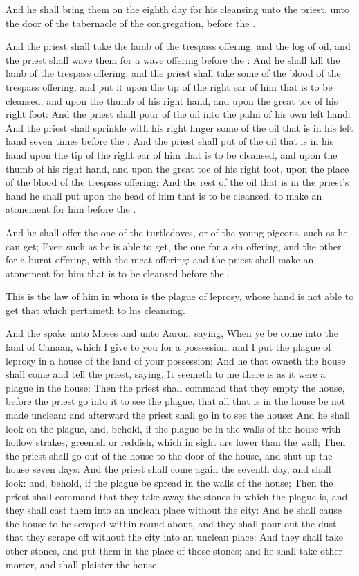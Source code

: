 \verse And he shall bring them on the eighth day for his cleansing unto the priest, unto the door of the tabernacle of the congregation, before the \LORD.

\verse And the priest shall take the lamb of the trespass offering, and the log of oil, and the priest shall wave them for a wave offering before the \LORD: \verse And he shall kill the lamb of the trespass offering, and the priest shall take some of the blood of the trespass offering, and put it upon the tip of the right ear of him that is to be cleansed, and upon the thumb of his right hand, and upon the great toe of his right foot: \verse And the priest shall pour of the oil into the palm of his own left hand: \verse And the priest shall sprinkle with his right finger some of the oil that is in his left hand seven times before the \LORD: \verse And the priest shall put of the oil that is in his hand upon the tip of the right ear of him that is to be cleansed, and upon the thumb of his right hand, and upon the great toe of his right foot, upon the place of the blood of the trespass offering: \verse And the rest of the oil that is in the priest's hand he shall put upon the head of him that is to be cleansed, to make an atonement for him before the \LORD.

\verse And he shall offer the one of the turtledoves, or of the young pigeons, such as he can get; \verse Even such as he is able to get, the one for a sin offering, and the other for a burnt offering, with the meat offering: and the priest shall make an atonement for him that is to be cleansed before the \LORD.

\verse This is the law of him in whom is the plague of leprosy, whose hand is not able to get that which pertaineth to his cleansing.

\verse And the \LORD spake unto Moses and unto Aaron, saying, \verse When ye be come into the land of Canaan, which I give to you for a possession, and I put the plague of leprosy in a house of the land of your possession; \verse And he that owneth the house shall come and tell the priest, saying, It seemeth to me there is as it were a plague in the house: \verse Then the priest shall command that they empty the house, before the priest go into it to see the plague, that all that is in the house be not made unclean: and afterward the priest shall go in to see the house: \verse And he shall look on the plague, and, behold, if the plague be in the walls of the house with hollow strakes, greenish or reddish, which in sight are lower than the wall; \verse Then the priest shall go out of the house to the door of the house, and shut up the house seven days: \verse And the priest shall come again the seventh day, and shall look: and, behold, if the plague be spread in the walls of the house; \verse Then the priest shall command that they take away the stones in which the plague is, and they shall cast them into an unclean place without the city: \verse And he shall cause the house to be scraped within round about, and they shall pour out the dust that they scrape off without the city into an unclean place: \verse And they shall take other stones, and put them in the place of those stones; and he shall take other morter, and shall plaister the house.

